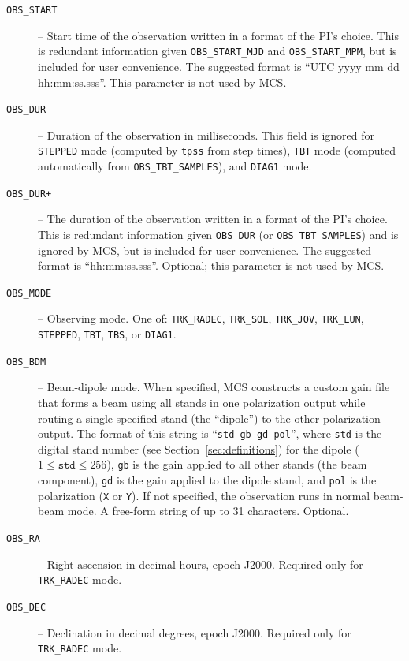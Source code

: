 \begin{description}
\item[\texttt{OBS\_START}] -- Start time of the observation written in a format of the PI's choice.  This is redundant information given \texttt{OBS\_START\_MJD} and \texttt{OBS\_START\_MPM}, but is included for user convenience.  The suggested format is ``UTC yyyy mm dd hh:mm:ss.sss''.  This parameter is not used by MCS.

\item[\texttt{OBS\_DUR}] -- Duration of the observation in milliseconds.  This field is ignored for \texttt{STEPPED} mode (computed by \texttt{tpss} from step times), \texttt{TBT} mode (computed automatically from \texttt{OBS\_TBT\_SAMPLES}), and \texttt{DIAG1} mode.

\item[\texttt{OBS\_DUR+}] -- The duration of the observation written in a format of the PI's choice.  This is redundant information given \texttt{OBS\_DUR} (or \texttt{OBS\_TBT\_SAMPLES}) and is ignored by MCS, but is included for user convenience.  The suggested format is ``hh:mm:ss.sss''.  Optional; this parameter is not used by MCS.

\item[\texttt{OBS\_MODE}] -- Observing mode.  One of: \texttt{TRK\_RADEC}, \texttt{TRK\_SOL}, \texttt{TRK\_JOV}, \texttt{TRK\_LUN}, \texttt{STEPPED}, \texttt{TBT}, \texttt{TBS}, or \texttt{DIAG1}.

\item[\texttt{OBS\_BDM}] -- Beam-dipole mode.  When specified, MCS constructs a custom gain file that forms a beam using all stands in one polarization output while routing a single specified stand (the ``dipole'') to the other polarization output.  The format of this string is ``\texttt{std gb gd pol}'', where \texttt{std} is the digital stand number (see Section~\ref{sec:definitions}) for the dipole ($1 \le \texttt{std} \le 256$), \texttt{gb} is the gain applied to all other stands (the beam component), \texttt{gd} is the gain applied to the dipole stand, and \texttt{pol} is the polarization (\texttt{X} or \texttt{Y}).  If not specified, the observation runs in normal beam-beam mode.  A free-form string of up to 31 characters.  Optional.

\item[\texttt{OBS\_RA}] -- Right ascension in decimal hours, epoch J2000.  Required only for \texttt{TRK\_RADEC} mode.

\item[\texttt{OBS\_DEC}] -- Declination in decimal degrees, epoch J2000.  Required only for \texttt{TRK\_RADEC} mode.
\end{description}

